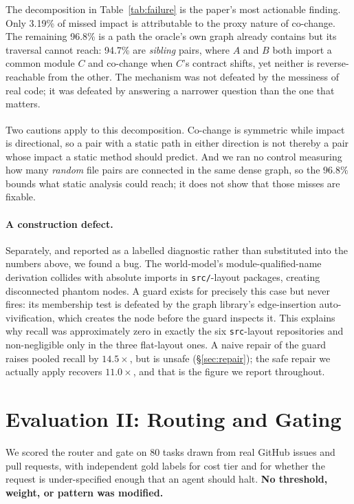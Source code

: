 \documentclass[sigconf,review,anonymous]{acmart}
\newcommand{\corr}{\textsuperscript{\dag}}
\begin{document}
The decomposition in Table~\ref{tab:failure} is the paper's most actionable finding.
Only 3.19\% of missed impact is attributable to the proxy nature of co-change. The
remaining 96.8\% is a path the oracle's own graph already contains but its
traversal cannot reach: 94.7\% are \emph{sibling} pairs, where $A$ and $B$ both import a
common module $C$ and co-change when $C$'s contract shifts, yet neither is reverse-reachable
from the other. The mechanism was not defeated by the messiness of real code; it was defeated
by answering a narrower question than the one that matters.

Two cautions apply to this decomposition\corr{}. Co-change is symmetric while impact is
directional, so a pair with a static path in either direction is not thereby a pair whose impact a
static method should predict. And we ran no control measuring how many \emph{random} file pairs
are connected in the same dense graph, so the $96.8\%$ bounds what static analysis could reach; it
does not show that those misses are fixable.

\paragraph{A construction defect.} Separately, and reported as a labelled diagnostic rather
than substituted into the numbers above, we found a bug. The world-model's module-qualified-name
derivation collides with absolute imports in \texttt{src/}-layout packages, creating
disconnected phantom nodes. A guard exists for precisely this case but never fires: its
membership test is defeated by the graph library's edge-insertion auto-vivification, which
creates the node before the guard inspects it. This explains why recall was approximately zero
in exactly the six \texttt{src}-layout repositories and non-negligible only in the three
flat-layout ones. A naive repair of the guard raises pooled recall by $14.5\times$, but is unsafe
(\S\ref{sec:repair}); the safe repair we actually apply recovers $11.0\times$, and that is the
figure we report throughout.

\section{Evaluation II: Routing and Gating}\label{sec:eval2}

We scored the router and gate on 80 tasks drawn from real GitHub issues and pull requests,
with independent gold labels for cost tier and for whether the request is under-specified
enough that an agent should halt. \textbf{No threshold, weight, or pattern was modified.}
\end{document}
